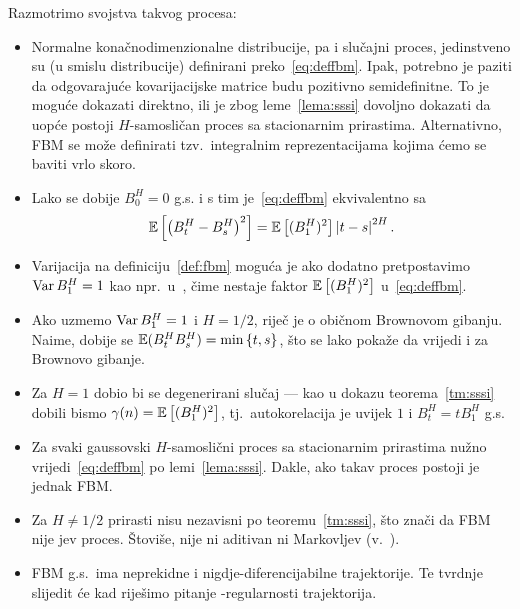 \documentclass[main.tex]{subfiles}
\begin{document}
\noindent Razmotrimo svojstva takvog procesa:
\begin{itemize}
	\item Normalne konačnodimenzionalne distribucije, pa i slučajni proces, jedinstveno su (u smislu distribucije) definirani preko~\eqref{eq:deffbm}. Ipak, potrebno je paziti da odgovarajuće kovarijacijske matrice budu pozitivno semidefinitne. To je moguće dokazati direktno,
	      ili je zbog leme~\ref{lema:sssi} dovoljno dokazati da uopće postoji \( H \)-samosličan
	      proces sa stacionarnim prirastima. Alternativno, FBM se može definirati tzv.\ integralnim
	      reprezentacijama kojima ćemo se baviti vrlo skoro.

	\item Lako se dobije \( B^H_0 = 0 \) g.s. i s tim je~\eqref{eq:deffbm} ekvivalentno sa
	      \begin{equation}\label{eq:deffbmalt}
		      \mathbb{E} \left[ \left( B^H_t-B^H_s \right)^2 \right] = \mathbb{E}\left[ (B^H_1)^2 \right] \left| {t-s} \right|^{2H}.
	      \end{equation}


	\item Varijacija na definiciju~\ref{def:fbm} moguća je ako dodatno pretpostavimo \( \operatorname{Var} B_1^H = 1 \) kao npr.\ u~\cite{se}, čime nestaje faktor \( \mathbb{E}\left[ (B_1^H)^2 \right] \) u~\eqref{eq:deffbm}.

	\item Ako uzmemo \( \operatorname{Var} B_1^H = 1 \) i \( H=1/2 \), riječ je o običnom Brownovom gibanju. Naime, dobije se \( \mathbb{E}(B^H_tB^H_s) = \min\left\{ t,s \right\} \), što se lako pokaže da vrijedi i za Brownovo gibanje.
	\item Za \( H=1 \) dobio bi se degenerirani slučaj --- kao u dokazu teorema~\ref{tm:sssi} dobili bismo \( \gamma(n) = \mathbb{E}\left[ (B^H_1)^2 \right] \), tj.\ autokorelacija je uvijek \( 1 \) i
	      \( B^H_t = tB_1^H \) g.s.

	\item Za svaki gaussovski \( H \)-samoslični proces sa stacionarnim prirastima
	      nužno vrijedi~\eqref{eq:deffbm} po lemi~\eqref{lema:sssi}. Dakle,
	      ako takav proces postoji je jednak FBM.


	\item Za \( H \neq 1/2 \) prirasti nisu nezavisni po teoremu~\ref{tm:sssi}, što znači da FBM nije \levy jev proces. Štoviše, nije ni aditivan ni Markovljev (v.~\cite{se}).

	\item FBM g.s.\ ima neprekidne i nigdje-diferencijabilne trajektorije. Te tvrdnje
	      slijedit će kad riješimo pitanje \holder -regularnosti trajektorija.


\end{itemize}
\end{document}
